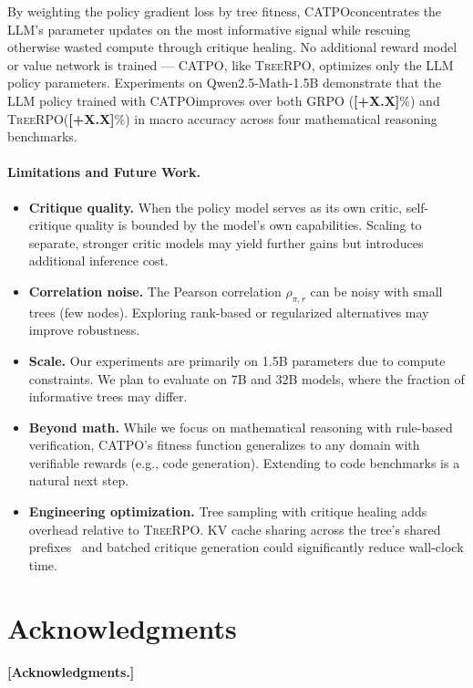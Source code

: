 \documentclass{article} %
\newcommand{\CATPO}{\textsc{CATPO}}
\newcommand{\TreeRPO}{\textsc{TreeRPO}}
\newcommand{\placeholder}[1]{{\color{red}\textbf{[#1]}}}
\begin{document}
By weighting the policy gradient loss by tree fitness, \CATPO concentrates the LLM's parameter updates on the most informative signal while rescuing otherwise wasted compute through critique healing. No additional reward model or value network is trained --- \CATPO, like \TreeRPO, optimizes only the LLM policy parameters. Experiments on Qwen2.5-Math-1.5B demonstrate that the LLM policy trained with \CATPO improves over both GRPO (\placeholder{+X.X}\%) and \TreeRPO (\placeholder{+X.X}\%) in macro accuracy across four mathematical reasoning benchmarks.

\paragraph{Limitations and Future Work.}
\begin{itemize}
    \item \textbf{Critique quality.} When the policy model serves as its own critic, self-critique quality is bounded by the model's own capabilities. Scaling to separate, stronger critic models may yield further gains but introduces additional inference cost.
    \item \textbf{Correlation noise.} The Pearson correlation $\rho_{\pi,r}$ can be noisy with small trees (few nodes). Exploring rank-based or regularized alternatives may improve robustness.
    \item \textbf{Scale.} Our experiments are primarily on 1.5B parameters due to compute constraints. We plan to evaluate on 7B and 32B models, where the fraction of informative trees may differ.
    \item \textbf{Beyond math.} While we focus on mathematical reasoning with rule-based verification, \CATPO's fitness function generalizes to any domain with verifiable rewards (e.g., code generation). Extending to code benchmarks is a natural next step.
    \item \textbf{Engineering optimization.} Tree sampling with critique healing adds overhead relative to \TreeRPO. KV cache sharing across the tree's shared prefixes~\citep{vllm} and batched critique generation could significantly reduce wall-clock time.
\end{itemize}


\section*{Acknowledgments}
\placeholder{Acknowledgments.}
\end{document}
